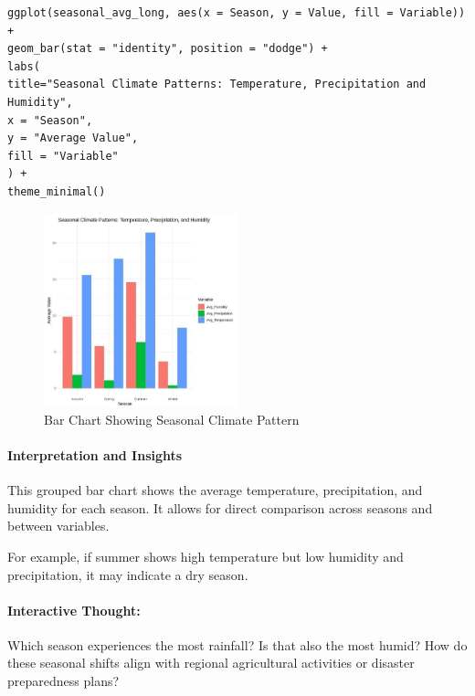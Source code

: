 \begin{verbatim}
ggplot(seasonal_avg_long, aes(x = Season, y = Value, fill = Variable)) +
geom_bar(stat = "identity", position = "dodge") +
labs(
title="Seasonal Climate Patterns: Temperature, Precipitation and Humidity",
x = "Season",
y = "Average Value",
fill = "Variable"
) +
theme_minimal()
\end{verbatim}

\begin{figure}[h]
\centering
\includegraphics[width=0.5\textwidth]{figures/barchart.jpg}
\caption{Bar Chart Showing Seasonal Climate Pattern}
\end{figure}

\paragraph{Interpretation and Insights} This grouped bar chart shows the average temperature, precipitation, and humidity for each season. It allows for direct comparison across seasons and between variables.

For example, if summer shows high temperature but low humidity and precipitation, it may indicate a dry season.

\paragraph{Interactive Thought:}

Which season experiences the most rainfall? Is that also the most humid? How do these seasonal shifts align with regional agricultural activities or disaster preparedness plans?
\clearpage

